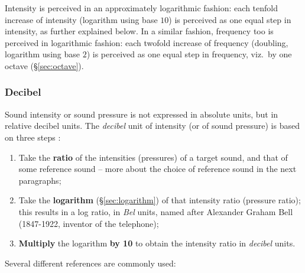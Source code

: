 \documentclass[
]{book}
\begin{document}
Intensity is perceived in an approximately logarithmic fashion: each tenfold increase of intensity (logarithm using base \(10\)) is perceived as one equal step in intensity, as further explained below. In a similar fashion, frequency too is perceived in logarithmic fashion: each twofold increase of frequency (doubling, logarithm using base \(2\)) is perceived as one equal step in frequency, viz.~by one octave (§\ref{sec:octave}).

\subsubsection{Decibel}\label{sec:decibel}

Sound intensity or sound pressure is not expressed in absolute units, but in relative decibel units. The \emph{decibel} unit of intensity (or of sound pressure) is based on three steps \citep[91ff]{Fry_1979}:

\begin{enumerate}
\def\labelenumi{\arabic{enumi}.}
\item
  Take the \textbf{ratio} of the intensities (pressures) of a target sound, and that of some reference sound -- more about the choice of reference sound in the next paragraphs;
\item
  Take the \textbf{logarithm} (§\ref{sec:logarithm}) of that intensity ratio (pressure ratio); this results in a log ratio, in \emph{Bel} units, named after Alexander Graham Bell (1847-1922, inventor of the telephone);
\item
  \textbf{Multiply} the logarithm \textbf{by 10} to obtain the intensity ratio in \emph{decibel} units.
\end{enumerate}

Several different references are commonly used:
\end{document}
